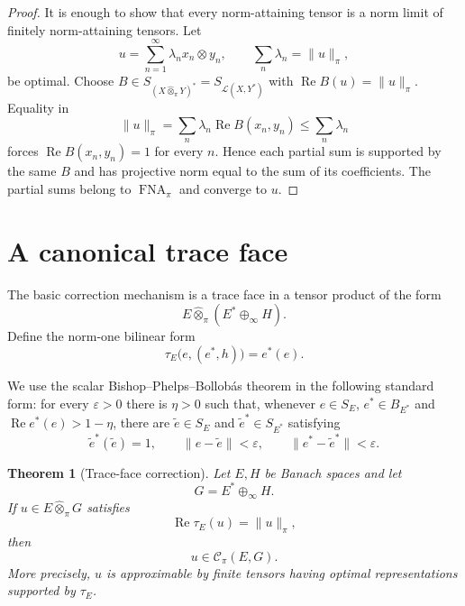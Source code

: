 \documentclass[11pt]{article}
\newtheorem{theorem}{Theorem}[section]
\theoremstyle{definition}
\theoremstyle{remark}
\newcommand{\whot}{\widehat\otimes_\pi}
\newcommand{\FNA}{\operatorname{FNA}_\pi}
\newcommand{\Lin}{\mathcal L}
\newcommand{\Rea}{\operatorname{Re}}
\newcommand{\Cpi}{\mathscr C_\pi}
\begin{document}
\begin{proof}
It is enough to show that every norm-attaining tensor is a norm limit of finitely norm-attaining tensors.  Let
\[
 u=\sum_{n=1}^\infty\lambda_nx_n\otimes y_n,
 \qquad \sum_n\lambda_n=\|u\|_\pi,
\]
be optimal.  Choose $B\in S_{(X\whot Y)^*}=S_{\Lin(X,Y^*)}$ with $\Rea B(u)=\|u\|_\pi$.  Equality in
\[
 \|u\|_\pi
 =\sum_n\lambda_n\Rea B(x_n,y_n)
 \leq \sum_n\lambda_n
\]
forces $\Rea B(x_n,y_n)=1$ for every $n$.  Hence each partial sum is supported by the same $B$ and has projective norm equal to the sum of its coefficients.  The partial sums belong to $\FNA$ and converge to $u$.
\end{proof}

\section{A canonical trace face}

The basic correction mechanism is a trace face in a tensor product of the form
\[
 E\whot(E^*\oplus_\infty H).
\]
Define the norm-one bilinear form
\[
 \tau_E\bigl(e,(e^*,h)\bigr)=e^*(e).
\]

We use the scalar Bishop--Phelps--Bollob\'as theorem in the following standard form: for every $\varepsilon>0$ there is $\eta>0$ such that, whenever $e\in S_E$, $e^*\in B_{E^*}$ and $\Rea e^*(e)>1-\eta$, there are $\widetilde e\in S_E$ and $\widetilde e^*\in S_{E^*}$ satisfying
\[
 \widetilde e^*(\widetilde e)=1,
 \qquad
 \|e-\widetilde e\|<\varepsilon,
 \qquad
 \|e^*-\widetilde e^*\|<\varepsilon.
\]

\begin{theorem}[Trace-face correction]\label{thm:trace}
Let $E,H$ be Banach spaces and let
\[
 G=E^*\oplus_\infty H.
\]
If $u\in E\whot G$ satisfies
\[
 \Rea\tau_E(u)=\|u\|_\pi,
\]
then
\[
 u\in\Cpi(E,G).
\]
More precisely, $u$ is approximable by finite tensors having optimal representations supported by $\tau_E$.
\end{theorem}
\end{document}
